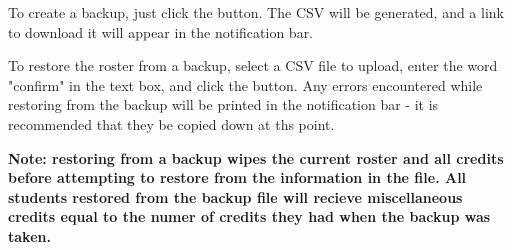 \documentclass[letterpaper,titlepage]{article}
\begin{document}
To create a backup, just click the button. The CSV will be generated, and a link to download it will appear in the notification bar.

To restore the roster from a backup, select a CSV file to upload, enter the word "confirm" in the text box, and click the button. Any errors encountered while restoring from the backup will be printed in the notification bar - it is recommended that they be copied down at ths point.

\textbf{Note: restoring from a backup wipes the current roster and all credits before attempting to restore from the information in the file. All students restored from the backup file will recieve miscellaneous credits equal to the numer of credits they had when the backup was taken.}
\end{document}

